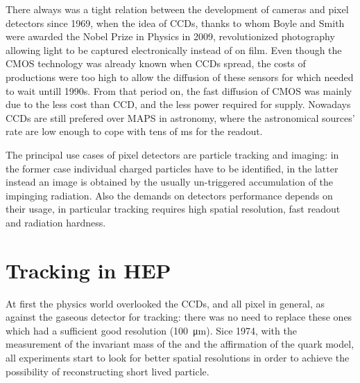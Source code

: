 There always was a tight relation between the development of cameras and pixel detectors since 1969, when the idea of CCDs, thanks to whom Boyle and Smith were awarded the Nobel Prize in Physics in 2009, revolutionized photography allowing light to be captured electronically instead of on film. 
Even though the CMOS technology was already known when CCDs spread, the costs of productions were too high to allow the diffusion of these sensors for which needed to wait untill 1990s. From that period on, the fast diffusion of CMOS was mainly due to the less cost than CCD, and the less power required for supply. Nowadays CCDs are still prefered over MAPS in astronomy, where the astronomical sources' rate are low enough to cope with tens of \si{ms} for the readout.  

The principal use cases of pixel detectors are particle tracking and imaging: in the former case individual charged particles have to be identified, in the latter instead an image is obtained by the usually un-triggered accumulation of the impinging radiation. 
Also the demands on detectors performance depends on their usage, in particular tracking requires high spatial resolution, fast readout and radiation hardness. 


\section{Tracking in HEP}
    At first the physics world overlooked the CCDs, and all pixel in general, as against the gaseous detector for tracking: there was no need to replace these ones which had a sufficient good resolution (\SI{100}{\um}). Sice 1974, with the measurement of the invariant mass of the  and the affirmation of the quark model, all experiments start to look for better spatial resolutions in order to achieve the possibility of reconstructing short lived particle.  

